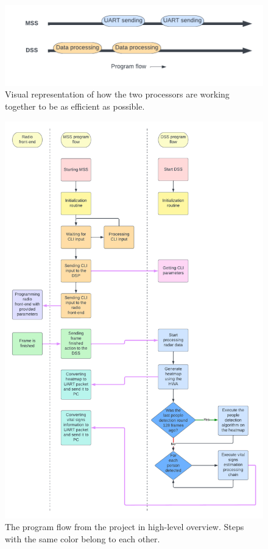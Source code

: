 \begin{figure}[t]
\centering
\includegraphics[width=.95\textwidth]{figures/realtime_implementation/timing_diagram.pdf}
\caption{Visual representation of how the two processors are working together to be as efficient as possible.}
\label{fig:uart_timing}
\end{figure}

\begin{figure}[t]
\centering
\includegraphics[width=.95\textwidth]{figures/realtime_implementation/Program flow.pdf}
\caption{The program flow from the project in high-level overview. Steps with the same color belong to each other.}
\label{fig:program_flow}
\end{figure}

